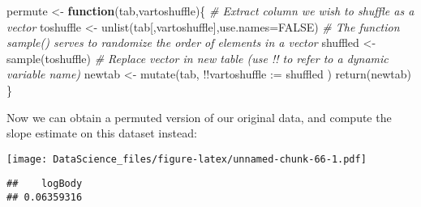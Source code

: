 \documentclass[
]{book}
\newenvironment{Shaded}{\begin{snugshade}}{\end{snugshade}}
\newcommand{\AttributeTok}[1]{\textcolor[rgb]{0.77,0.63,0.00}{#1}}
\newcommand{\CommentTok}[1]{\textcolor[rgb]{0.56,0.35,0.01}{\textit{#1}}}
\newcommand{\ConstantTok}[1]{\textcolor[rgb]{0.00,0.00,0.00}{#1}}
\newcommand{\ControlFlowTok}[1]{\textcolor[rgb]{0.13,0.29,0.53}{\textbf{#1}}}
\newcommand{\DecValTok}[1]{\textcolor[rgb]{0.00,0.00,0.81}{#1}}
\newcommand{\FunctionTok}[1]{\textcolor[rgb]{0.00,0.00,0.00}{#1}}
\newcommand{\NormalTok}[1]{#1}
\newcommand{\OtherTok}[1]{\textcolor[rgb]{0.56,0.35,0.01}{#1}}
\newcommand{\SpecialCharTok}[1]{\textcolor[rgb]{0.00,0.00,0.00}{#1}}
\newcommand{\StringTok}[1]{\textcolor[rgb]{0.31,0.60,0.02}{#1}}
\begin{document}
\begin{Shaded}
\begin{Highlighting}[]
\NormalTok{permute }\OtherTok{\textless{}{-}} \ControlFlowTok{function}\NormalTok{(tab,vartoshuffle)\{}
  \CommentTok{\# Extract column we wish to shuffle as a vector}
\NormalTok{  toshuffle }\OtherTok{\textless{}{-}} \FunctionTok{unlist}\NormalTok{(tab[,vartoshuffle],}\AttributeTok{use.names=}\ConstantTok{FALSE}\NormalTok{)}
  \CommentTok{\# The function sample() serves to randomize the order of elements in a vector}
\NormalTok{  shuffled }\OtherTok{\textless{}{-}} \FunctionTok{sample}\NormalTok{(toshuffle)}
  \CommentTok{\# Replace vector in new table (use !! to refer to a dynamic variable name)}
\NormalTok{  newtab }\OtherTok{\textless{}{-}} \FunctionTok{mutate}\NormalTok{(tab, }\SpecialCharTok{!!}\AttributeTok{vartoshuffle :=}\NormalTok{ shuffled )}
  \FunctionTok{return}\NormalTok{(newtab)}
\NormalTok{\}}
\end{Highlighting}
\end{Shaded}

Now we can obtain a permuted version of our original data, and compute the slope estimate on this dataset instead:

\begin{Shaded}
\end{Shaded}

\texttt{[image: DataScience\_files/figure-latex/unnamed-chunk-66-1.pdf]}

\begin{Shaded}
\end{Shaded}

\begin{verbatim}
##    logBody 
## 0.06359316
\end{verbatim}
\end{document}
